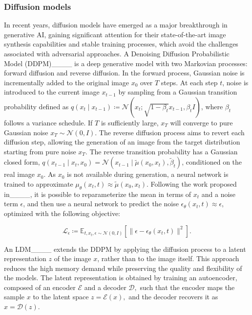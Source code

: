 \subsubsection{Diffusion models}\label{sec:diffusionmodels}
In recent years, diffusion models have emerged as a major breakthrough in generative AI, gaining significant attention for their state-of-the-art image synthesis capabilities and stable training processes, which avoid the challenges associated with adversarial approaches. A Denoising Diffusion Probabilistic Model (DDPM)____ is a deep generative model with two Markovian processes: forward diffusion and reverse diffusion. In the forward process, Gaussian noise is incrementally added to the original image $x_0$ over $T$ steps. At each step $t$, noise is introduced to the current image $x_{t-1}$ by sampling from a Gaussian transition probability defined as $q(x_t \mid x_{t-1}) \coloneqq \mathcal{N}(x_t; \sqrt{1 - \beta_t}x_{t-1}, \beta_t I)$, where $\beta_t$ follows a variance schedule. If $T$ is sufficiently large, $x_T$ will converge to pure Gaussian noise $x_T \sim \mathcal{N}(0, I)$. The reverse diffusion process aims to revert each diffusion step, allowing the generation of an image from the target distribution starting from pure noise $x_T$. The reverse transition probability has a Gaussian closed form, $q(x_{t-1} \mid x_t, x_0) = \mathcal{N}(x_{t-1} \mid \tilde\mu(x_0, x_t), \tilde\beta_t)$, conditioned on the real image $x_0$. As $x_0$ is not available during generation, a neural network is trained to approximate $\mu_\theta(x_t, t) \approx \tilde\mu(x_0, x_t)$. Following the work proposed in____, it is possible to reparameterize the mean in terms of $x_t$ and a noise term $\epsilon$, and then use a neural network to predict the noise $\epsilon_\theta(x_t, t) \approx \epsilon$, optimized with the following objective:

\begin{equation}
\mathcal{L}_{\epsilon} \coloneqq \mathbb{E}_{t, x_t, \epsilon \sim \mathcal{N}(0, I)} \left[ 
\lVert \epsilon - \epsilon_\theta(x_t, t) \rVert^2 \right].
\label{eqn:ddpmloss}
\end{equation}

An LDM____ extends the DDPM by applying the diffusion process to a latent representation $z$ of the image $x$, rather than to the image itself. This approach reduces the high memory demand while preserving the quality and flexibility of the models. The latent representation is obtained by training an autoencoder, composed of an encoder $\mathcal{E}$ and a decoder $\mathcal{D},$ such that the encoder maps the sample $x$ to the latent space $z = \mathcal{E}(x),$ and the decoder recovers it as $x = \mathcal{D}(z)$.


